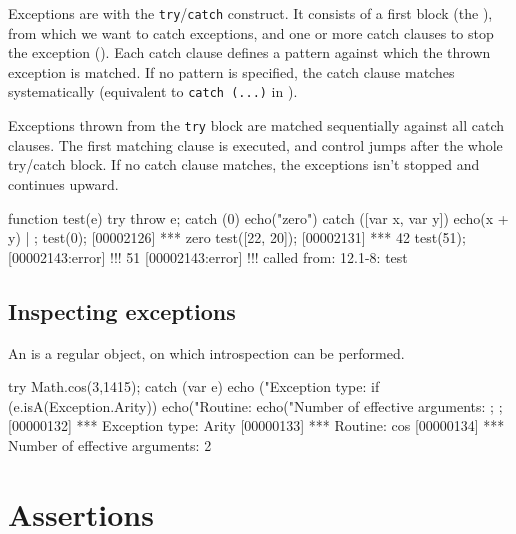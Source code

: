 Exceptions are  with the
\lstinline|try|/\lstinline|catch| construct. It consists of a first
block (the ), from which we want to catch exceptions,
and one or more catch clauses to stop the exception
(). Each catch clause defines a pattern against
which the thrown exception is matched. If no pattern is specified, the
catch clause matches systematically (equivalent to
\lstinline|catch (...)| in \Cxx).

Exceptions thrown from the \texttt{try} block are matched sequentially
against all catch clauses. The first matching clause is executed, and
control jumps after the whole try/catch block. If no catch clause
matches, the exceptions isn't stopped and continues
upward.

\begin{urbiscript}[firstnumber=last]
function test(e)
{
  try
  { throw e;  }
  catch (0)
  { echo("zero") }
  catch ([var x, var y])
  { echo(x + y) }
} | {};
test(0);
[00002126] *** zero
test([22, 20]);
[00002131] *** 42
test(51);
[00002143:error] !!! 51
[00002143:error] !!!    called from: 12.1-8: test
\end{urbiscript}

\subsection{Inspecting exceptions}

An  is a regular object, on which introspection
can be performed.

\begin{urbiscript}[firstnumber=last]
try
{
  Math.cos(3,1415);
}
catch (var e)
{
  echo ("Exception type: %
  if (e.isA(Exception.Arity))
  {
    echo("Routine: %
    echo("Number of effective arguments: %
  };
};
[00000132] *** Exception type: Arity
[00000133] *** Routine: cos
[00000134] *** Number of effective arguments: 2
\end{urbiscript}


\section{Assertions}
\label{sec:assertions}

